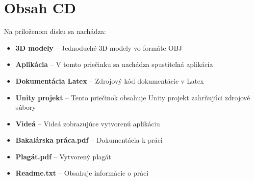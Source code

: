 





\chapter{Obsah CD}
Na priloženom disku sa nachádza:
\begin{itemize}
\item \textbf{3D modely} -- Jednoduché 3D modely vo formáte OBJ
\item \textbf{Aplikácia} -- V tomto priečinku sa nachádza spustiteľná aplikácia
\item \textbf{Dokumentácia Latex} -- Zdrojový kód dokumentácie v Latex
\item \textbf{Unity projekt} -- Tento priečinok obsahuje Unity projekt zahrňujúci zdrojové súbory
\item \textbf{Videá} -- Videá zobrazujúce vytvorenú aplikáciu
\item \textbf{Bakalárska práca.pdf} -- Dokumentácia k práci
\item \textbf{Plagát.pdf} -- Vytvorený plagát
\item \textbf{Readme.txt} -- Obsahuje informácie o práci
\end{itemize}


